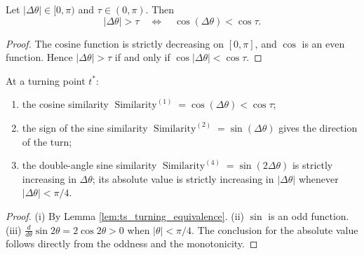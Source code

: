 \begin{lemma}\label{lem:ts_turning_equivalence}
Let $|\Delta\theta| \in [0, \pi)$ and $\tau \in (0, \pi)$. Then
\[
|\Delta\theta| > \tau \quad \Longleftrightarrow \quad \cos(\Delta\theta) < \cos\tau.
\]
\end{lemma}

\begin{proof}
The cosine function is strictly decreasing on $[0, \pi]$, and $\cos$ is an even function. Hence $|\Delta\theta| > \tau$ if and only if $\cos|\Delta\theta| < \cos\tau$.
\end{proof}

\begin{proposition}\label{prop:ts_turning_similarity}
At a turning point $t^*$:
\begin{enumerate}[label=(\roman*)]
    \item the cosine similarity $\operatorname{Similarity}^{(1)} = \cos(\Delta\theta) < \cos\tau$;
    \item the sign of the sine similarity $\operatorname{Similarity}^{(2)} = \sin(\Delta\theta)$ gives the direction of the turn;
    \item the double-angle sine similarity $\operatorname{Similarity}^{(4)} = \sin(2\Delta\theta)$ is strictly increasing in $\Delta\theta$; its absolute value is strictly increasing in $|\Delta\theta|$ whenever $|\Delta\theta| < \pi/4$.
\end{enumerate}
\end{proposition}

\begin{proof}
(i) By Lemma \ref{lem:ts_turning_equivalence}. (ii) $\sin$ is an odd function. (iii) $\frac{d}{d\theta}\sin 2\theta = 2\cos 2\theta > 0$ when $|\theta| < \pi/4$. The conclusion for the absolute value follows directly from the oddness and the monotonicity.
\end{proof}

